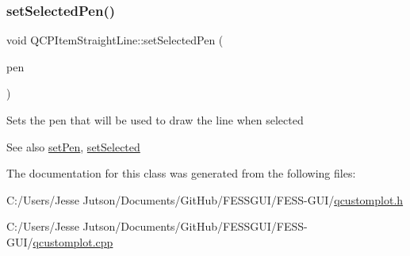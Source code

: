 \subsubsection{\texorpdfstring{set\+Selected\+Pen()}{setSelectedPen()}}
{\footnotesize\ttfamily void Q\+C\+P\+Item\+Straight\+Line\+::set\+Selected\+Pen (\begin{DoxyParamCaption}\item[{const Q\+Pen \&}]{pen }\end{DoxyParamCaption})}

Sets the pen that will be used to draw the line when selected

\begin{DoxySeeAlso}{See also}
\hyperlink{class_q_c_p_item_straight_line_a9f36c9c9e60d7d9ac084c80380ac8601}{set\+Pen}, \hyperlink{class_q_c_p_abstract_item_a203de94ad586cc44d16c9565f49d3378}{set\+Selected} 
\end{DoxySeeAlso}


The documentation for this class was generated from the following files\+:\begin{DoxyCompactItemize}
\item 
C\+:/\+Users/\+Jesse Jutson/\+Documents/\+Git\+Hub/\+F\+E\+S\+S\+G\+U\+I/\+F\+E\+S\+S-\/\+G\+U\+I/\hyperlink{qcustomplot_8h}{qcustomplot.\+h}\item 
C\+:/\+Users/\+Jesse Jutson/\+Documents/\+Git\+Hub/\+F\+E\+S\+S\+G\+U\+I/\+F\+E\+S\+S-\/\+G\+U\+I/\hyperlink{qcustomplot_8cpp}{qcustomplot.\+cpp}\end{DoxyCompactItemize}
